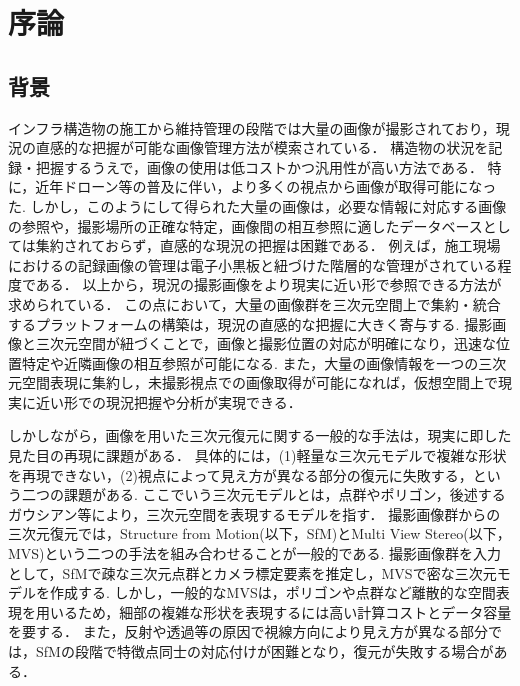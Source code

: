 \section{序論}\label{sec:intro}
\subsection{背景}\label{subsec:background}

インフラ構造物の施工から維持管理の段階では大量の画像が撮影されており，現況の直感的な把握が可能な画像管理方法が模索されている．
構造物の状況を記録・把握するうえで，画像の使用は低コストかつ汎用性が高い方法である．
特に，近年ドローン等の普及に伴い，より多くの視点から画像が取得可能になった. 
しかし，このようにして得られた大量の画像は，必要な情報に対応する画像の参照や，撮影場所の正確な特定，画像間の相互参照に適したデータベースとしては集約されておらず，直感的な現況の把握は困難である．
例えば，施工現場におけるの記録画像の管理は電子小黒板と紐づけた階層的な管理がされている程度\cite{kouji-shashin}である．
以上から，現況の撮影画像をより現実に近い形で参照できる方法が求められている．
この点において，大量の画像群を三次元空間上で集約・統合するプラットフォームの構築は，現況の直感的な把握に大きく寄与する.
撮影画像と三次元空間が紐づくことで，画像と撮影位置の対応が明確になり，迅速な位置特定や近隣画像の相互参照が可能になる.
また，大量の画像情報を一つの三次元空間表現に集約し，未撮影視点での画像取得が可能になれば，仮想空間上で現実に近い形での現況把握や分析が実現できる．\par

しかしながら，画像を用いた三次元復元に関する一般的な手法は，現実に即した見た目の再現に課題がある．
具体的には，(1)軽量な三次元モデルで複雑な形状を再現できない，(2)視点によって見え方が異なる部分の復元に失敗する，という二つの課題がある.
ここでいう三次元モデルとは，点群やポリゴン，後述するガウシアン等により，三次元空間を表現するモデルを指す．
撮影画像群からの三次元復元では，Structure from Motion(以下，SfM)とMulti View Stereo(以下，MVS)という二つの手法を組み合わせることが一般的である.
撮影画像群を入力として，SfMで疎な三次元点群とカメラ標定要素を推定し，MVSで密な三次元モデルを作成する.
しかし，一般的なMVSは，ポリゴンや点群など離散的な空間表現を用いるため，細部の複雑な形状を表現するには高い計算コストとデータ容量を要する．
また，反射や透過等の原因で視線方向により見え方が異なる部分では，SfMの段階で特徴点同士の対応付けが困難となり，復元が失敗する場合がある．\par

